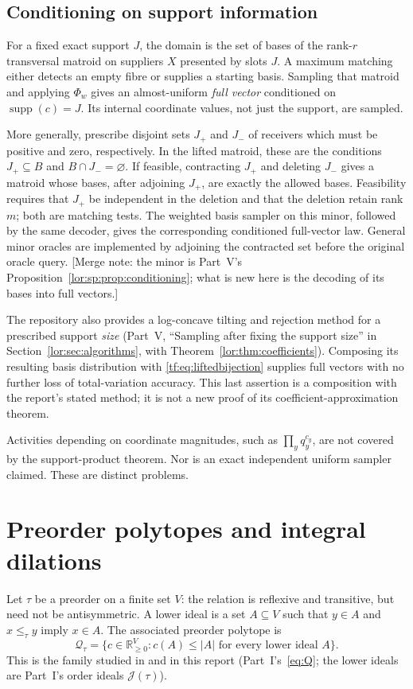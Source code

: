 \documentclass[11pt]{article}
\numberwithin{equation}{section}
\theoremstyle{definition}
\newcommand{\R}{\mathbb R}
\newcommand{\J}{\mathcal J(\tau)}
\newcommand{\Qt}{\mathcal Q_\tau}
\newcommand{\supp}{\operatorname{supp}}
\begin{document}
\subsection{Conditioning on support information}
For a fixed exact support $J$, the domain is the set of bases of the
rank-$r$ transversal matroid on suppliers $X$ presented by slots $J$.
A maximum matching either detects an empty fibre or supplies a starting
basis. Sampling that matroid and applying $\Phi_w$ gives an almost-uniform
\emph{full vector} conditioned on $\supp(c)=J$. Its internal coordinate
values, not just the support, are sampled.

More generally, prescribe disjoint sets $J_+$ and $J_-$ of receivers
which must be positive and zero, respectively. In the lifted matroid,
these are the conditions $J_+\subseteq B$ and $B\cap J_-=\varnothing$.
If feasible, contracting $J_+$ and deleting $J_-$ gives a matroid whose
bases, after adjoining $J_+$, are exactly the allowed bases. Feasibility
requires that $J_+$ be independent in the deletion and that the deletion
retain rank $m$; both are matching tests. The weighted basis sampler on
this minor, followed by the same decoder, gives the corresponding
conditioned full-vector law. General minor oracles are implemented by
adjoining the contracted set before the original oracle query.
[Merge note: the minor is Part~V's Proposition~\ref{lor:sp:prop:conditioning};
what is new here is the decoding of its bases into full vectors.]

The repository also provides a log-concave tilting and rejection method
for a prescribed support \emph{size} (Part~V, ``Sampling after fixing the
support size'' in Section~\ref{lor:sec:algorithms}, with
Theorem~\ref{lor:thm:coefficients}). Composing its resulting
basis distribution with \eqref{tf:eq:liftedbijection} supplies full vectors
with no further loss of total-variation accuracy. This last assertion is
a composition with the report's stated method; it is not a new proof of
its coefficient-approximation theorem.

Activities depending on coordinate magnitudes, such as
$\prod_yq_y^{c_y}$, are not covered by the support-product theorem. Nor is
an exact independent uniform sampler claimed. These are distinct problems.

\section{Preorder polytopes and integral dilations}
\label{tf:sec:preorders}
Let $\tau$ be a preorder on a finite set $V$: the relation is reflexive
and transitive, but need not be antisymmetric. A lower ideal is a set
$A\subseteq V$ such that $y\in A$ and $x\le_\tau y$ imply $x\in A$.
The associated preorder polytope is
\begin{equation}
 \Qt=\{c\in\R_{\ge0}^{V}:c(A)\le |A|
                  \text{ for every lower ideal }A\}.
 \label{tf:eq:preorderpolytope}
\end{equation}
This is the family studied in \cite{AC} and in this report
(Part~I's~\eqref{eq:Q}; the lower ideals are Part~I's order ideals $\J$).
\end{document}
